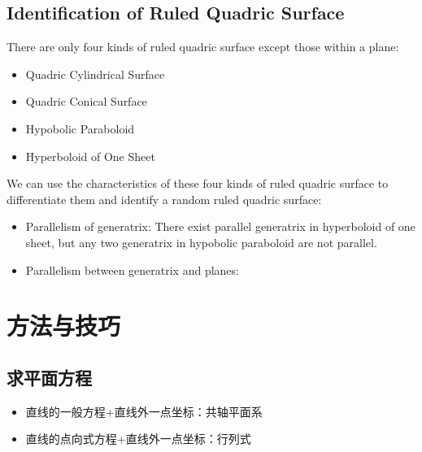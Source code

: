 \documentclass[onecolumn]{ctexart}
\begin{document}
\subsection{Identification of Ruled Quadric Surface}

There are only four kinds of ruled quadric surface except those within a plane:
\begin{itemize}
  \item Quadric Cylindrical Surface
  \item Quadric Conical Surface
  \item Hypobolic Paraboloid
  \item Hyperboloid of One Sheet
\end{itemize}

We can use the characteristics of these four kinds of ruled quadric surface to 
differentiate them and identify a random ruled quadric surface:
\begin{itemize}
  \item Parallelism of generatrix: There exist parallel generatrix in 
  hyperboloid of one sheet, but any two generatrix in hypobolic paraboloid are 
  not parallel.
  \item Parallelism between generatrix and planes: 
\end{itemize}

\section{方法与技巧}

\subsection{求平面方程}
\begin{itemize}
  \item 直线的一般方程+直线外一点坐标：共轴平面系
  \item 直线的点向式方程+直线外一点坐标：行列式
\end{itemize}
\end{document}
